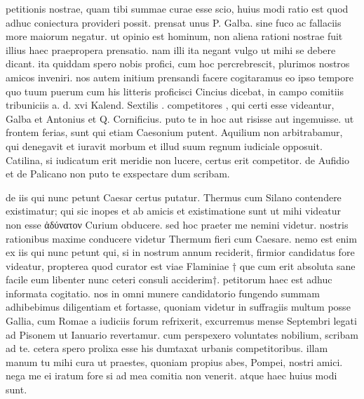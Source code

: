 


 petitionis nostrae, quam tibi summae curae esse scio, huius modi ratio est quod adhuc coniectura provideri possit. prensat unus P. Galba. sine fuco ac fallaciis more maiorum negatur. ut opinio est hominum, non aliena rationi nostrae fuit illius haec praepropera prensatio. nam illi ita negant vulgo ut mihi se debere dicant. ita quiddam spero nobis profici, cum hoc percrebrescit, plurimos nostros amicos inveniri. nos autem initium prensandi facere cogitaramus eo ipso tempore quo tuum puerum cum his litteris proficisci Cincius dicebat, in campo comitiis tribuniciis a. d. xvi Kalend. Sextilis . competitores , qui certi esse videantur, Galba et Antonius et Q. Cornificius. puto te in hoc aut risisse aut ingemuisse. ut frontem ferias, sunt qui etiam Caesonium putent. Aquilium non arbitrabamur, qui denegavit et iuravit morbum et illud suum regnum iudiciale opposuit. Catilina, si iudicatum erit meridie non lucere, certus erit competitor. de Aufidio et de Palicano non puto te exspectare dum scribam.

 de iis qui nunc petunt Caesar certus putatur. Thermus cum Silano contendere existimatur; qui sic inopes et ab amicis et existimatione sunt ut mihi videatur non esse ἀδύνατον Curium obducere. sed hoc praeter me nemini videtur. nostris rationibus maxime conducere videtur Thermum fieri cum Caesare. nemo est enim ex iis qui nunc petunt qui, si in nostrum annum reciderit, firmior candidatus fore videatur, propterea quod curator est viae Flaminiae † que cum erit absoluta sane facile eum libenter nunc ceteri consuli acciderim†. petitorum haec est adhuc informata cogitatio. nos in omni munere candidatorio fungendo summam adhibebimus diligentiam et fortasse, quoniam videtur in suffragiis multum posse Gallia, cum Romae a iudiciis forum refrixerit, excurremus mense Septembri legati ad Pisonem ut Ianuario revertamur. cum perspexero voluntates nobilium, scribam ad te. cetera spero prolixa esse his dumtaxat urbanis competitoribus. illam manum tu mihi cura ut praestes, quoniam propius abes, Pompei, nostri amici. nega me ei iratum fore si ad mea comitia non venerit. atque haec huius modi sunt.

